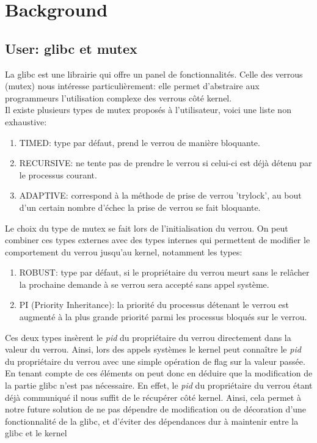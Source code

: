 \section{Background}

\subsection{User: glibc et mutex}
La glibc est une librairie qui offre un panel de fonctionnalités. 
Celle des verrous (mutex) nous intéresse particulièrement: elle permet 
d'abstraire aux programmeurs l'utilisation complexe des verrous côté kernel.
\\

Il existe plusieurs types de mutex proposés à l'utilisateur, voici une liste non exhaustive:
\begin{enumerate}
	\item TIMED: type par défaut, prend le verrou de manière bloquante.
	\item RECURSIVE: ne tente pas de prendre le verrou si celui-ci est
	déjà détenu par le processus courant.
	\item ADAPTIVE: correspond à la méthode de prise de verrou 'trylock',
	au bout d'un certain nombre d'échec la prise de verrou se fait
	bloquante.
\end{enumerate}
Le choix du type de mutex se fait lors de l'initialisation du verrou.
On peut combiner ces types externes avec des types internes qui permettent de
modifier le comportement du verrou jusqu'au kernel, notamment les types:

\begin{enumerate}
	\item ROBUST: type par défaut, si le propriétaire du verrou meurt sans
	le relâcher la prochaine demande à se verrou sera accepté sans appel
	système.
	\item PI (Priority Inheritance): la priorité du processus détenant le
	verrou est augmenté à la plus grande priorité parmi les processus
	bloqués sur le verrou.
\end{enumerate}
Ces deux types insèrent le \textit{pid} du propriétaire du verrou
directement dans la valeur du verrou. Ainsi, lors des appels systèmes le kernel
peut connaître le \textit{pid} du propriétaire du verrou avec une simple
opération de flag sur la valeur passée.
\\

En tenant compte de ces éléments on peut donc en déduire que la modification 
de la partie glibc n'est pas nécessaire. En effet, le \textit{pid} du 
propriétaire du verrou étant déjà communiqué il nous suffit de le récupérer 
côté kernel. Ainsi, cela permet à notre future solution de ne pas dépendre de 
modification ou de décoration d'une fonctionnalité de la glibc, et d'éviter
des dépendances dur à maintenir entre la glibc et le kernel

